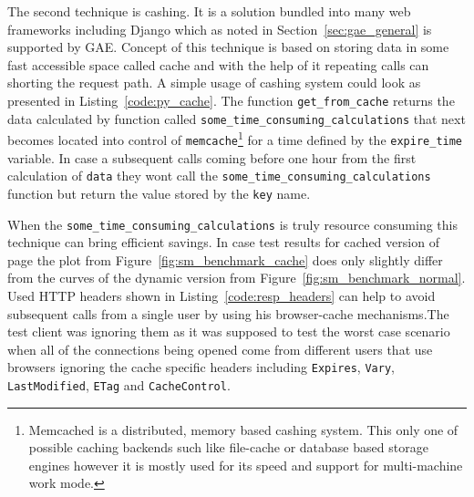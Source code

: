 The second technique is cashing. It is a solution bundled into many web frameworks including Django which as noted  in Section~\ref{sec:gae_general} is supported by GAE. Concept of this technique is based on storing data in some fast accessible space called cache and with the help of it repeating calls can shorting the request path. A simple usage of cashing system could look as presented in Listing~\ref{code:py_cache}. The function \texttt{get\_from\_cache} returns the data calculated by function called \texttt{some\_time\_consuming\_calculations} that next becomes located into control of \texttt{memcache}\footnote{Memcached is a distributed, memory based cashing system. This only one of possible caching backends such like file-cache or database based storage engines however it is mostly used for its speed and support for multi-machine work mode.} for a time defined by the \texttt{expire\_time} variable. In case a subsequent calls coming before one hour from the first calculation of \texttt{data} they wont call the \texttt{some\_time\_consuming\_calculations} function but return the value stored by the \texttt{key} name.        

When the \texttt{some\_time\_consuming\_calculations} is truly resource consuming this technique can bring efficient savings. In case test results for cached version of page the plot from Figure~\ref{fig:sm_benchmark_cache} does only slightly differ from the curves of the dynamic version from Figure~\ref{fig:sm_benchmark_normal}. Used HTTP headers shown in Listing~\ref{code:resp_headers} can help to avoid subsequent calls from a single user by using his browser-cache mechanisms.The test client was ignoring them as it was supposed to test the worst case scenario when all of the connections being opened come from different users that use browsers ignoring the cache specific headers including \texttt{Expires}, \texttt{Vary}, \texttt{Last\-Modified}, \texttt{ETag} and \texttt{Cache\-Control}. 

